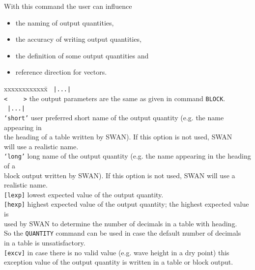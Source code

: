 \documentclass[12pt]{book}
\begin{document}
\noindent
With this command the user can influence
\begin{itemize}
   \item the naming of output quantities,
   \item the accuracy of writing output quantities,
   \item the definition of some output quantities and
   \item reference direction for vectors.
\end{itemize}

\begin{tabbing}
 xxxxxxxxxxxx\= \kill
\, {\tt  |...|}    \> \\
{\tt <} \, \, \, \, {\tt >} \> the output parameters are the same as given in command {\tt BLOCK}.\\
\, {\tt  |...|}    \> \\
{\tt `short'}      \> user preferred short name of the output quantity (e.g. the name appearing in\+\\
                      the heading of a table written by SWAN). If this option is not used, SWAN\\
                      will use a realistic name.\-\\
{\tt `long'}       \> long name of the output quantity (e.g. the name appearing in the heading of a\+\\
                      block output written by SWAN). If this option is not used, SWAN will use a\\
                      realistic name.\-\\
{\tt [lexp]}       \> lowest expected value of the output quantity.\\
{\tt [hexp]}       \> highest expected value of the output quantity; the highest expected value is\+\\
                      used by SWAN to determine the number of decimals in a table with heading.\\
                      So the {\tt QUANTITY} command can be used in case the default number of decimals\\
                      in a table is unsatisfactory.\-\\
{\tt [excv]}       \> in case there is no valid value (e.g. wave height in a dry point) this\+\\
                      exception value of the output quantity is written in a table or block output.\-\\
\end{tabbing}
\end{document}
